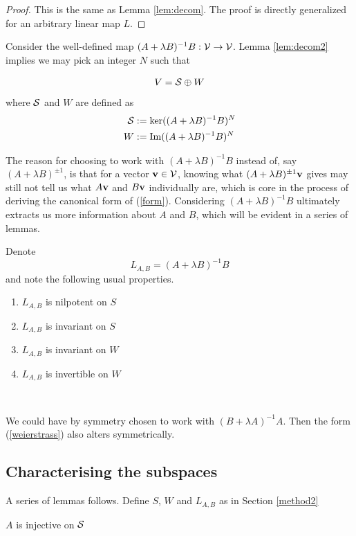 \begin{proof}
  This is the same as Lemma \ref{lem:decom}. The proof is directly generalized for an arbitrary linear map $L$.
\end{proof}

Consider the well-defined map $(A+\lambda B)^{-1}B:\mathcal{V}\rightarrow \mathcal{V}$. Lemma \ref{lem:decom2} implies we may pick an integer $N$ such that 

\begin{equation}\label{plus}
    V=\mathcal{S} \oplus W
\end{equation}
where $\mathcal{S}$ and $W$ are defined as
\begin{align}
    \mathcal{S}&:=\ker ((A+\lambda B)^{-1}B)^N\\
    W&:=\operatorname{Im} ((A+\lambda B)^{-1}B)^N
\end{align}
\begin{remark}
    The reason for choosing to work with $(A+\lambda B)^{-1}B$ instead of, say  $(A+\lambda B)^{\pm1}$, is that for a vector $\mathbf{v} \in \mathcal{V}$, knowing what $(A+\lambda B)^{\pm 1}\mathbf{v}$ gives may still not tell us what $A\mathbf{v}$ and $B\mathbf{v}$ individually are, which is core in the process of deriving the canonical form of (\ref{form}). Considering $(A+\lambda B)^{-1}B$ ultimately extracts us more information about $A$ and $B$, which will be evident in a series of lemmas.
\end{remark} 
Denote $$\boxed{L_{A,B}=(A+\lambda B)^{-1}B}$$and note the following usual properties.
\begin{property}
    \mbox{}
\begin{enumerate} 
    \item \label{first} $L_{A,B}$ is nilpotent on $S$
    \item \label{2nd} $L_{A,B}$ is invariant on $S$
    \item \label{3rd} $L_{A,B}$ is invariant on $W$
    \item \label{4th} $L_{A,B}$ is invertible on $W$
\end{enumerate}
\end{property}
\

\begin{remark}
    We could have by symmetry chosen to work with $(B+\lambda A)^{-1}A$. Then the form (\ref{weierstrass}) also alters symmetrically.
\end{remark}

\subsection{Characterising the subspaces}
A series of lemmas follows. Define $S$, $W$ and $L_{A,B}$ as in Section \ref{method2}
\begin{lemma}\label{injectivityA}
    $A$ is injective on $\mathcal{S}$
\end{lemma}

